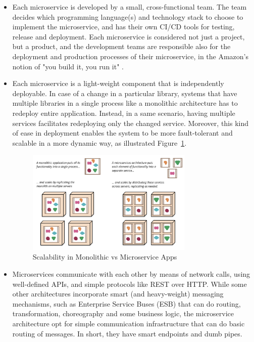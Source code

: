 \documentclass{Configuration_Files/PoliMi3i_thesis}
\begin{document}
\begin{itemize}
    \item Each microservice is developed by a small, cross-functional team.
    The team decides which programming language(s) and technology stack to choose to implement the microservice, and has their own CI/CD tools for testing, release and deployment.
    Each microservice is considered not just a project, but a product, and the development teams are responsible also for the deployment and production processes of their microservice, in the Amazon's notion of "you build it, you run it" \cite{youbuild}.
    
    \item Each microservice is a light-weight component that is independently deployable. In case of a change in a particular library, systems that have multiple libraries in a single process like a monolithic architecture has to redeploy entire application. Instead, in a same scenario, having multiple services facilitates redeploying only the changed service. Moreover, this kind of ease in deployment enables the system to be more fault-tolerant and scalable in a more dynamic way, as illustrated Figure~\ref{fig:scalability}.
    
    \begin{figure}[H]
    \centering
    \includegraphics[width=0.75\textwidth]{myImages/scalable.png}
    \caption{Scalability in Monolithic vs Microservice Apps}
    \label{fig:scalability}
\end{figure}

    \item Microservices communicate with each other by means of network calls, using well-defined APIs, and simple protocols like REST over HTTP. While some other architectures incorporate smart (and heavy-weight) messaging mechanisms, such as Enterprise Service Buses (ESB) that can do routing, transformation, choreography and some business logic, the microservice architecture opt for simple communication infrastructure that can do basic routing of messages. In short, they have smart endpoints and dumb pipes.


\end{itemize}
\end{document}
